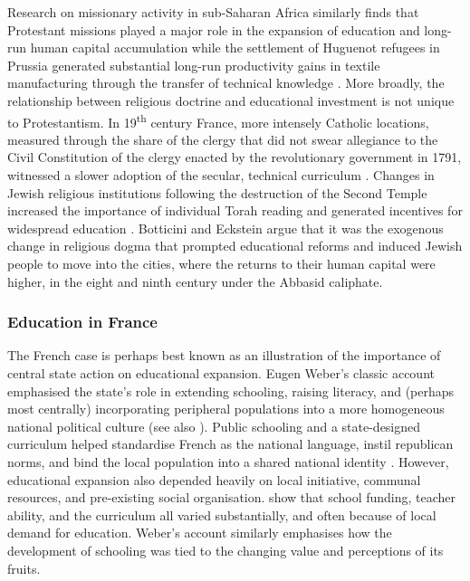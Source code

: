 \documentclass[12pt]{article}
\begin{document}
Research on missionary activity in sub-Saharan Africa similarly finds that Protestant missions played a major role in the expansion of education and long-run human capital accumulation \parencite{woodberryMissionaryRootsLiberal2012, woodberryReligionSpreadHuman2011, cageLongTermEffectsPrinting2016} while the settlement of Huguenot refugees in Prussia generated substantial long-run productivity gains in textile manufacturing through the transfer of technical knowledge \parencite{hornungImmigrationDiffusionTechnology2014}. More broadly, the relationship between religious doctrine and educational investment is not unique to Protestantism. In 19\textsuperscript{th} century France, more intensely Catholic locations, measured through the share of the clergy that did not swear allegiance to the Civil Constitution of the clergy enacted by the revolutionary government in 1791, witnessed a slower adoption of the secular, technical curriculum  \parencite{squicciariniDevotionDevelopmentReligiosity2020}. Changes in Jewish religious institutions following the destruction of the Second Temple increased the importance of individual Torah reading and generated incentives for widespread education \parencite{botticiniJewishOccupationalSelection,botticiniFarmersMerchantsConversions2007}. Botticini and Eckstein argue that it was the exogenous change in religious dogma that prompted educational reforms and induced Jewish people to move into the cities, where the returns to their human capital were higher, in the eight and ninth century under the Abbasid caliphate. 

\subsubsection{Education in France}

The French case is perhaps best known as an illustration of the importance of central state action on educational expansion. Eugen Weber's \parencite*{weberPeasantsFrenchmenModernization1976a} classic account emphasised the state's role in extending schooling, raising literacy, and (perhaps most centrally) incorporating peripheral populations into a more homogeneous national political culture (see also \cite{furetReadingWritingLiteracy1983}). Public schooling and a state-designed curriculum helped standardise French as the national language, instil republican norms, and bind the local population into a shared national identity \parencite{GuillaumeblanccomFilesTheme}. However, educational expansion also depended heavily on local initiative, communal resources, and pre-existing social organisation. \textcite{furetReadingWritingLiteracy1983} show that school funding, teacher ability, and the curriculum all varied substantially, and often because of local demand for education. Weber's \parencite*[p. 303]{weberPeasantsFrenchmenModernization1976a} account similarly emphasises how the development of schooling was tied to the changing value and perceptions of its fruits. 
\end{document}
